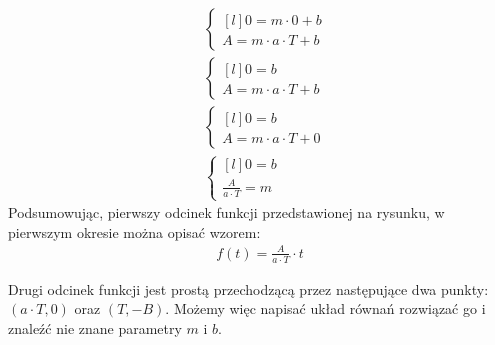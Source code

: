 \begin{task}
\begin{align*}
&\left\{\begin{matrix*}[l]
0 = m\cdot 0 +b\\ 
A = m\cdot a \cdot T +b
\end{matrix*}\right. \\
&\left\{\begin{matrix*}[l]
0 = b\\ 
A = m \cdot a\cdot T +b
\end{matrix*}\right. \\
&\left\{\begin{matrix*}[l]
0 = b\\ 
A = m \cdot a\cdot T +0
\end{matrix*}\right. \\
&\left\{\begin{matrix*}[l]
0 = b\\ 
\frac{A}{a\cdot T} = m
\end{matrix*}\right.
\end{align*}
Podsumowując, pierwszy odcinek funkcji przedstawionej na rysunku, w pierwszym okresie można opisać wzorem:
\begin{align*}
f(t) = \frac{A}{a \cdot T}\cdot t
\end{align*}

Drugi odcinek funkcji jest prostą przechodzącą przez następujące dwa punkty: $(a \cdot T,0)$ oraz $(T,-B)$. Możemy więc napisać układ równań rozwiązać go i znaleźć nie znane parametry $m$ i $b$.


\end{task}
